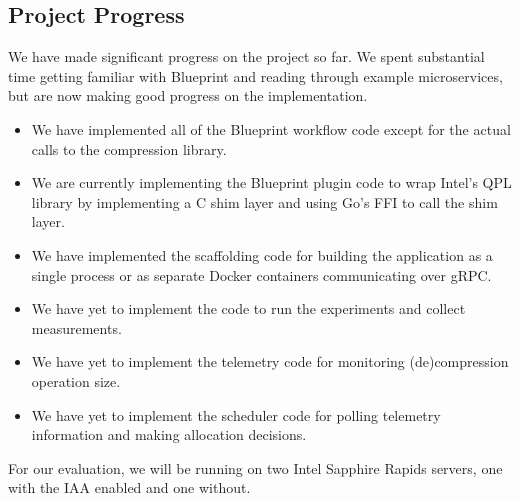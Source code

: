 \subsection{Project Progress}

We have made significant progress on the project so far.
We spent substantial time getting familiar with Blueprint and reading through example microservices, but are now making good progress on the implementation.
\begin{itemize}
    \item We have implemented all of the Blueprint workflow code except for the actual calls to the compression library.
    \item We are currently implementing the Blueprint plugin code to wrap Intel's QPL library by implementing a C shim layer and using Go's FFI to call the shim layer.
    \item We have implemented the scaffolding code for building the application as a single process or as separate Docker containers communicating over gRPC.
    \item We have yet to implement the code to run the experiments and collect measurements.
    \item We have yet to implement the telemetry code for monitoring (de)compression operation size.
    \item We have yet to implement the scheduler code for polling telemetry information and making allocation decisions.
\end{itemize}
For our evaluation, we will be running on two Intel Sapphire Rapids servers, one with the IAA enabled and one without.
